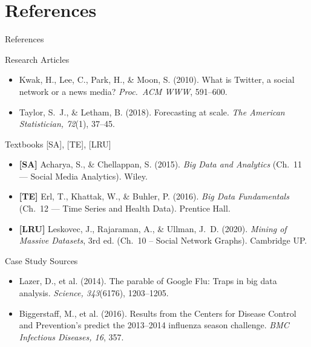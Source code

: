 \documentclass[aspectratio=169,10pt]{beamer}
\begin{document}
\section*{References}

\begin{frame}{References}
  \begin{block}{Research Articles}
    \begin{itemize}
      \item Kwak, H., Lee, C., Park, H., \& Moon, S. (2010).
            What is Twitter, a social network or a news media?
            \textit{Proc.\ ACM WWW}, 591--600.
      \item Taylor, S.~J., \& Letham, B. (2018).
            Forecasting at scale.
            \textit{The American Statistician, 72}(1), 37--45.
    \end{itemize}
  \end{block}
  \vspace{4pt}
  \begin{block}{Textbooks \textmd{[SA], [TE], [LRU]}}
    \begin{itemize}
      \item \textbf{[SA]} Acharya, S., \& Chellappan, S. (2015).
            \textit{Big Data and Analytics}
            (Ch.~11 — Social Media Analytics). Wiley.
      \item \textbf{[TE]} Erl, T., Khattak, W., \& Buhler, P. (2016).
            \textit{Big Data Fundamentals}
            (Ch.~12 — Time Series and Health Data). Prentice Hall.
      \item \textbf{[LRU]} Leskovec, J., Rajaraman, A., \& Ullman, J.~D.
            (2020). \textit{Mining of Massive Datasets}, 3rd ed.
            (Ch.~10 -- Social Network Graphs). Cambridge UP.
    \end{itemize}
  \end{block}
  \vspace{4pt}
  \begin{block}{Case Study Sources}
    \begin{itemize}
      \item Lazer, D., et al. (2014).
            The parable of Google Flu: Traps in big data analysis.
            \textit{Science, 343}(6176), 1203--1205.
      \item Biggerstaff, M., et al. (2016).
            Results from the Centers for Disease Control and
            Prevention's predict the 2013--2014 influenza season
            challenge. \textit{BMC Infectious Diseases, 16}, 357.
    \end{itemize}
  \end{block}
\end{frame}
\end{document}
